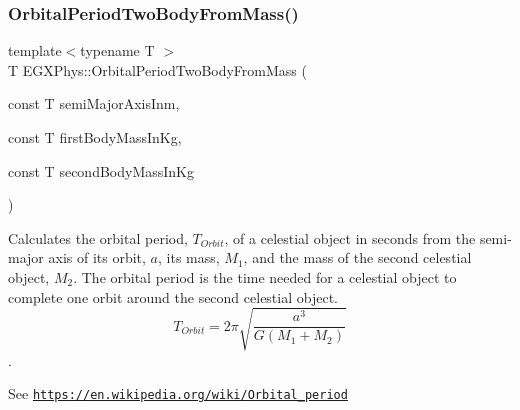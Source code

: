 \subsubsection{\texorpdfstring{Orbital\+Period\+Two\+Body\+From\+Mass()}{OrbitalPeriodTwoBodyFromMass()}}
{\footnotesize\ttfamily template$<$typename T $>$ \\
T E\+G\+X\+Phys\+::\+Orbital\+Period\+Two\+Body\+From\+Mass (\begin{DoxyParamCaption}\item[{const T}]{semi\+Major\+Axis\+Inm,  }\item[{const T}]{first\+Body\+Mass\+In\+Kg,  }\item[{const T}]{second\+Body\+Mass\+In\+Kg }\end{DoxyParamCaption})}



Calculates the orbital period, $T_{Orbit}$, of a celestial object in seconds from the semi-\/major axis of its orbit, $a$, its mass, $M_1$, and the mass of the second celestial object, $M_2$. The orbital period is the time needed for a celestial object to complete one orbit around the second celestial object. \[ T_{Orbit}=2\pi\sqrt{\dfrac{a^3}{G(M_1 + M_2)}}\]. 

See \href{https://en.wikipedia.org/wiki/Orbital_period}{\tt https\+://en.\+wikipedia.\+org/wiki/\+Orbital\+\_\+period}


